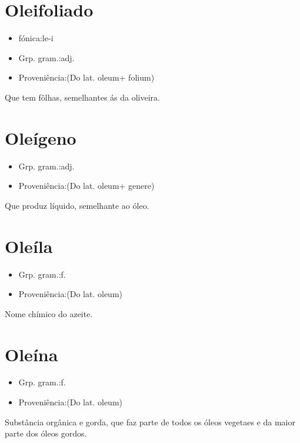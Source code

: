 \section{Oleifoliado}
\begin{itemize}
\item {fónica:le-i}
\end{itemize}
\begin{itemize}
\item {Grp. gram.:adj.}
\end{itemize}
\begin{itemize}
\item {Proveniência:(Do lat. \textunderscore oleum\textunderscore  + \textunderscore folium\textunderscore )}
\end{itemize}
Que tem fôlhas, semelhantes ás da oliveira.
\section{Oleígeno}
\begin{itemize}
\item {Grp. gram.:adj.}
\end{itemize}
\begin{itemize}
\item {Proveniência:(Do lat. \textunderscore oleum\textunderscore  + \textunderscore genere\textunderscore )}
\end{itemize}
Que produz líquido, semelhante ao óleo.
\section{Oleíla}
\begin{itemize}
\item {Grp. gram.:f.}
\end{itemize}
\begin{itemize}
\item {Proveniência:(Do lat. \textunderscore oleum\textunderscore )}
\end{itemize}
Nome chímico do azeite.
\section{Oleína}
\begin{itemize}
\item {Grp. gram.:f.}
\end{itemize}
\begin{itemize}
\item {Proveniência:(Do lat. \textunderscore oleum\textunderscore )}
\end{itemize}
Substância orgânica e gorda, que faz parte de todos os óleos vegetaes e da maior parte dos óleos gordos.
